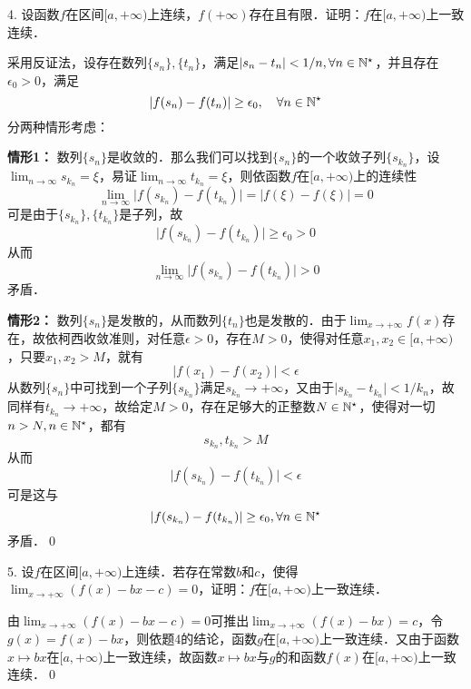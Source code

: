 4. 设函数$f$在区间$[a, +\infty)$上连续，$f(+\infty)$存在且有限．证明：$f$在$[a, +\infty)$上一致连续．

\prove 采用反证法，设存在数列$\{ s_n \}, \{ t_n \}$，满足$\lvert s_n - t_n \rvert < 1/n, \forall n \in \mathbb{N}^\star$，并且存在$\epsilon_0 > 0$，满足
\begin{equation}
    \lvert f(s_n) - f(t_n) \rvert \geq \epsilon_0, \quad \forall n \in \mathbb{N}^\star
\end{equation}
分两种情形考虑：

\textbf{情形1：} 数列$\{ s_n \}$是收敛的．那么我们可以找到$\{ s_n \}$的一个收敛子列$\{ s_{k_n} \}$，设$\displaystyle\lim_{n \to \infty} s_{k_n} = \xi$，易证$\displaystyle\lim_{n \to \infty} t_{k_n} = \xi$，则依函数$f$在$[a,+\infty)$上的连续性
\begin{equation}
    \lim_{n \to \infty} \lvert f(s_{k_n}) - f(t_{k_n}) \rvert = \lvert f(\xi) - f(\xi) \rvert = 0
\end{equation}
可是由于$\{s_{k_n}\}, \{t_{k_n}\}$是子列，故
\begin{equation}
    \lvert f(s_{k_n}) - f(t_{k_n}) \rvert \geq \epsilon_0 > 0
\end{equation}
从而
\begin{equation}
    \lim_{n \to \infty} \lvert f(s_{k_n}) - f(t_{k_n}) \rvert > 0
\end{equation}
矛盾．

\textbf{情形2：} 数列$\{ s_n \}$是发散的，从而数列$\{ t_n \}$也是发散的．由于$\displaystyle\lim_{x \to +\infty} f(x)$存在，故依柯西收敛准则，对任意$\epsilon > 0$，存在$M > 0$，使得对任意$x_1, x_2 \in [a, +\infty)$，只要$x_1, x_2 > M$，就有
\begin{equation}
    \lvert f(x_1) - f(x_2) \rvert < \epsilon
\end{equation}
从数列$\{ s_n \}$中可找到一个子列$\{ s_{k_n}\}$满足$s_{k_n} \to +\infty$，又由于$\lvert s_{k_n} - t_{k_n} \rvert < 1/k_n$，故同样有$t_{k_n} \to +\infty$，故给定$M > 0$，存在足够大的正整数$N \in \mathbb{N}^\star$，使得对一切$n > N, n \in \mathbb{N}^\star$，都有
\begin{equation}
    s_{k_n}, t_{k_n} > M
\end{equation}
从而
\begin{equation}
    \lvert f(s_{k_n}) - f(t_{k_n}) \rvert < \epsilon
\end{equation}
可是这与
\begin{equation}
    \lvert f(s_{k_n}) - f(t_{k_n}) \rvert \geq \epsilon_0, \forall n \in \mathbb{N}^\star
\end{equation}
矛盾．\qed\bigskip

5. 设$f$在区间$[a, +\infty)$上连续．若存在常数$b$和$c$，使得$\displaystyle\lim_{x \to +\infty} \left(f(x) - bx - c\right) = 0$，证明：$f$在$[a, +\infty)$上一致连续．

\prove 由$\displaystyle\lim_{x \to +\infty} (f(x) - bx - c) = 0$可推出$\displaystyle\lim_{x \to +\infty} (f(x) - bx) = c$，令$g(x) = f(x) - bx$，则依题4的结论，函数$g$在$[a, +\infty)$上一致连续．又由于函数$x \mapsto bx$在$[a, +\infty)$上一致连续，故函数$x \mapsto bx$与$g$的和函数$f(x)$在$[a, +\infty)$上一致连续．\qed\bigskip